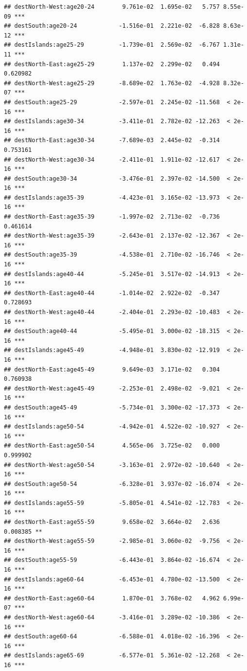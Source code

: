 \documentclass[
]{book}
\begin{document}
\begin{verbatim}
## destNorth-West:age20-24        9.761e-02  1.695e-02   5.757 8.55e-09 ***
## destSouth:age20-24            -1.516e-01  2.221e-02  -6.828 8.63e-12 ***
## destIslands:age25-29          -1.739e-01  2.569e-02  -6.767 1.31e-11 ***
## destNorth-East:age25-29        1.137e-02  2.299e-02   0.494 0.620982    
## destNorth-West:age25-29       -8.689e-02  1.763e-02  -4.928 8.32e-07 ***
## destSouth:age25-29            -2.597e-01  2.245e-02 -11.568  < 2e-16 ***
## destIslands:age30-34          -3.411e-01  2.782e-02 -12.263  < 2e-16 ***
## destNorth-East:age30-34       -7.689e-03  2.445e-02  -0.314 0.753161    
## destNorth-West:age30-34       -2.411e-01  1.911e-02 -12.617  < 2e-16 ***
## destSouth:age30-34            -3.476e-01  2.397e-02 -14.500  < 2e-16 ***
## destIslands:age35-39          -4.423e-01  3.165e-02 -13.973  < 2e-16 ***
## destNorth-East:age35-39       -1.997e-02  2.713e-02  -0.736 0.461614    
## destNorth-West:age35-39       -2.643e-01  2.137e-02 -12.367  < 2e-16 ***
## destSouth:age35-39            -4.538e-01  2.710e-02 -16.746  < 2e-16 ***
## destIslands:age40-44          -5.245e-01  3.517e-02 -14.913  < 2e-16 ***
## destNorth-East:age40-44       -1.014e-02  2.922e-02  -0.347 0.728693    
## destNorth-West:age40-44       -2.404e-01  2.293e-02 -10.483  < 2e-16 ***
## destSouth:age40-44            -5.495e-01  3.000e-02 -18.315  < 2e-16 ***
## destIslands:age45-49          -4.948e-01  3.830e-02 -12.919  < 2e-16 ***
## destNorth-East:age45-49        9.649e-03  3.171e-02   0.304 0.760938    
## destNorth-West:age45-49       -2.253e-01  2.498e-02  -9.021  < 2e-16 ***
## destSouth:age45-49            -5.734e-01  3.300e-02 -17.373  < 2e-16 ***
## destIslands:age50-54          -4.942e-01  4.522e-02 -10.927  < 2e-16 ***
## destNorth-East:age50-54        4.565e-06  3.725e-02   0.000 0.999902    
## destNorth-West:age50-54       -3.163e-01  2.972e-02 -10.640  < 2e-16 ***
## destSouth:age50-54            -6.328e-01  3.937e-02 -16.074  < 2e-16 ***
## destIslands:age55-59          -5.805e-01  4.541e-02 -12.783  < 2e-16 ***
## destNorth-East:age55-59        9.658e-02  3.664e-02   2.636 0.008385 ** 
## destNorth-West:age55-59       -2.985e-01  3.060e-02  -9.756  < 2e-16 ***
## destSouth:age55-59            -6.443e-01  3.864e-02 -16.674  < 2e-16 ***
## destIslands:age60-64          -6.453e-01  4.780e-02 -13.500  < 2e-16 ***
## destNorth-East:age60-64        1.870e-01  3.768e-02   4.962 6.99e-07 ***
## destNorth-West:age60-64       -3.416e-01  3.289e-02 -10.386  < 2e-16 ***
## destSouth:age60-64            -6.588e-01  4.018e-02 -16.396  < 2e-16 ***
## destIslands:age65-69          -6.577e-01  5.361e-02 -12.268  < 2e-16 ***

\end{verbatim}
\end{document}
